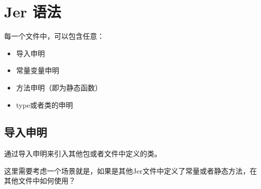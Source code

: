 \documentclass[12pt]{article}
\begin{document}
\section{Jer 语法}\label{jer-ux8bedux6cd5}

\begin{Shaded}
\begin{Highlighting}[]
\NormalTok{    ;}
\NormalTok{    ;}
\end{Highlighting}
\end{Shaded}

每一个文件中，可以包含任意：

\begin{itemize}
\tightlist
\item
  导入申明
\item
  常量变量申明
\item
  方法申明（即为静态函数）
\item
  type或者类的申明
\end{itemize}

\subsection{导入申明}\label{ux5bfcux5165ux7533ux660e}

通过导入申明来引入其他包或者文件中定义的类。

\begin{Shaded}
\begin{Highlighting}[]
\NormalTok{    ;}
\NormalTok{    ;}
\end{Highlighting}
\end{Shaded}

\begin{Shaded}
\begin{Highlighting}[]
\OperatorTok{/}\OperatorTok{/}
\OperatorTok{/}\OperatorTok{/}
\end{Highlighting}
\end{Shaded}

这里需要考虑一个场景就是，如果是其他Jer文件中定义了常量或者静态方法，在其他文件中如何使用？
\end{document}
